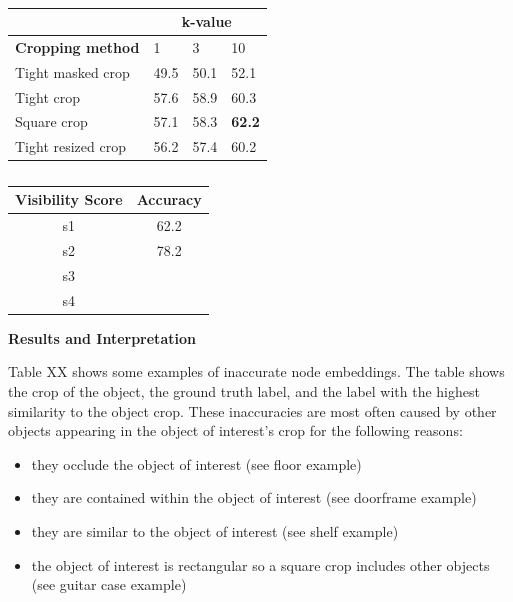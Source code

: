 \begin{table}[h!]
    \centering
    \caption{}
    \begin{tabular}{l|lll|}
    \cline{2-4}
                                                   & \multicolumn{3}{c|}{\textbf{k-value}} \\ \hline
    \multicolumn{1}{|c|}{\textbf{Cropping method}} & 1        & 3       & 10               \\ \hline
    \multicolumn{1}{|l|}{Tight masked crop}        & 49.5     & 50.1    & 52.1             \\
    \multicolumn{1}{|l|}{Tight crop}               & 57.6     & 58.9    & 60.3             \\
    \multicolumn{1}{|l|}{Square crop}              & 57.1     & 58.3    & \textbf{62.2}    \\
    \multicolumn{1}{|l|}{Tight resized crop}       & 56.2     & 57.4    & 60.2             \\ \hline
    \end{tabular}
\end{table}
\begin{table}[h!]
    \centering
    \caption{}
    \begin{tabular}{|c|c|}
    \hline
    \textbf{Visibility Score} & \textbf{Accuracy} \\ \hline
    s1                       & 62.2               \\ \hline
    s2                        & 78.2                  \\ \hline
    s3                        &                   \\ \hline
    s4                        &                   \\ \hline
    \end{tabular}
\end{table}

\bigskip
\noindent
\textbf{Results and Interpretation}

Table XX shows some examples of inaccurate node embeddings. The table shows the crop of the object, the ground truth label, and the label with the highest similarity to the object crop. These inaccuracies are most often caused by other objects appearing in the object of interest's crop for the following reasons:
\begin{itemize}
    \item they occlude the object of interest (see floor example)
    \item they are contained within the object of interest (see doorframe example)
    \item they are similar to the object of interest (see shelf example)
    \item the object of interest is rectangular so a square crop includes other objects (see guitar case example)
\end{itemize}


